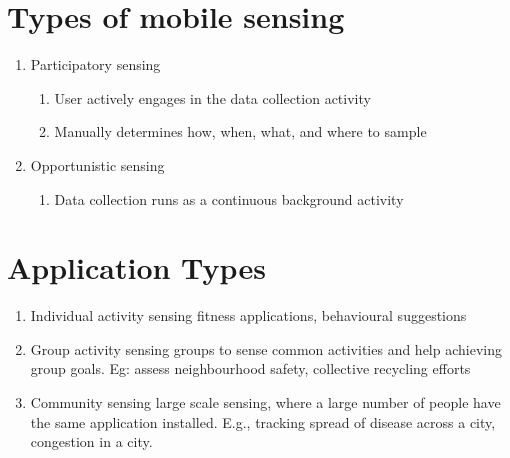 \section{Types of mobile sensing}  

\begin{enumerate}
    \item  Participatory sensing
    
    \begin{enumerate}
        \item  User actively engages in the data collection activity

        \item  Manually determines how, when, what, and where to sample
   
    \end{enumerate}
            
    \item  Opportunistic sensing
    
        \begin{enumerate}
        \item   Data collection runs as a continuous background activity

    \end{enumerate}
\end{enumerate}

\section{Application Types}
    \begin{enumerate}
        \item  Individual activity sensing fitness applications, behavioural suggestions

        \item  Group activity sensing groups to sense common activities and help achieving group goals. Eg: assess neighbourhood safety, collective recycling efforts 
        
        \item Community sensing large scale sensing, where a large number of people have the same application installed. E.g., tracking spread of disease across a city, congestion in a city.
    \end{enumerate}
    
